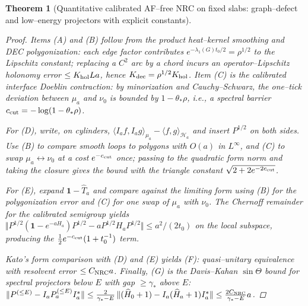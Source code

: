 \documentclass[11pt]{amsart}
\theoremstyle{plain}
\newtheorem{theorem}{Theorem}[section]
\theoremstyle{definition}
\theoremstyle{remark}
\renewcommand{\tfrac}[2]{\textstyle\frac{#1}{#2}}
\begin{document}
\begin{theorem}[Quantitative calibrated AF--free NRC on fixed slabs: graph--defect and low--energy projectors with explicit constants]
\begin{proof}
Items (A) and (B) follow from the product heat--kernel smoothing and DEC polygonization: each edge factor contributes $e^{-\lambda_1(G) t_0/2}=\rho^{1/2}$ to the Lipschitz constant; replacing a $C^2$ arc by a chord incurs an operator--Lipschitz holonomy error $\le K_{\rm hol} L a$, hence $K_{\rm dec}=\rho^{1/2}K_{\rm hol}$. Item (C) is the calibrated interface Doeblin contraction: by minorization and Cauchy--Schwarz, the one--tick deviation between $\mu_a$ and $\nu_0$ is bounded by $1-\theta_*\rho$, i.e., a spectral barrier $c_{\rm cut}=-\log(1-\theta_*\rho)$.

For (D), write, on cylinders, $\langle I_a f, I_a g\rangle_{\mu_a}-\langle f,g\rangle_{\mathcal H_a}$ and insert $P^{1/2}$ on both sides. Use (B) to compare smooth loops to polygons with $O(a)$ in $L^\infty$, and (C) to swap $\mu_a\leftrightarrow \nu_0$ at a cost $e^{-c_{\rm cut}}$ once; passing to the quadratic form norm and taking the closure gives the bound with the triangle constant $\sqrt{2+2 e^{-2 c_{\rm cut}}}$.

For (E), expand $\mathbf 1-\widehat T_a$ and compare against the limiting form using (B) for the polygonization error and (C) for one swap of $\mu_a$ with $\nu_0$. The Chernoff remainder for the calibrated semigroup yields $\Vert P^{1/2}(\mathbf 1-e^{-a H_a})P^{1/2}-a P^{1/2}H_a P^{1/2}\Vert\le a^2/(2 t_0)$ on the local subspace, producing the $\tfrac12 e^{-c_{\rm cut}}(1+t_0^{-1})$ term.

Kato's form comparison with (D) and (E) yields (F): quasi--unitary equivalence with resolvent error $\le C_{\rm NRC} a$. Finally, (G) is the Davis--Kahan $\sin\Theta$ bound for spectral projectors below $E$ with gap $\ge \gamma_*$ above $E$: $\Vert P^{(\le E)} - I_a P_a^{(\le E)} I_a^*\Vert \le \frac{2}{\gamma_* - E}\,\Vert(\widehat H_0+1) - I_a(\widehat H_a+1) I_a^*\Vert \le \frac{2 C_{\rm NRC}}{\gamma_* - E} a$.
\end{proof}
\end{theorem}
\end{document}
